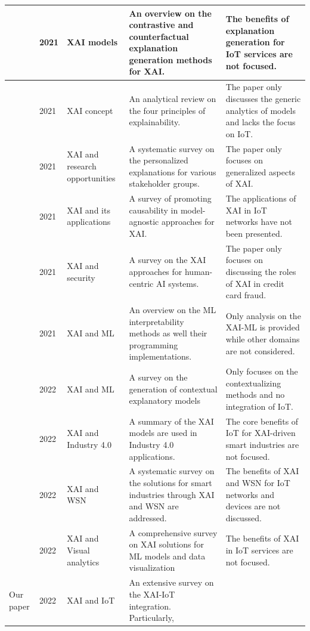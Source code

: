 \documentclass[journal]{IEEEtran}
\begin{document}
\begin{table}[!ht]
\begin{tabular}{|p{0.45cm}|p{0.5cm}|p{2.0cm}|p{7.45cm}|p{5.5cm}|}
\cite{stepin2021survey}  & 2021 & XAI models & An overview on the contrastive and counterfactual
explanation generation methods for XAI. & The benefits of explanation generation for IoT services are not focused.  \\ \hline
\cite{angelov2021explainable}  & 2021 & XAI concept & An analytical review on the four principles of explainability. & The paper only discusses the generic analytics of models and lacks the focus on IoT.  \\ \hline
\cite{meske2021explainable}  & 2021 & XAI and research opportunities & A systematic survey on the personalized explanations for various stakeholder groups. & The paper only focuses on generalized aspects of XAI.  \\ \hline
\cite{chou2021counterfactuals}  & 2021 & XAI and its applications & A survey of promoting causability in model-agnostic approaches for XAI. & The applications of XAI in IoT networks have not been presented.   \\ \hline
\cite{islam2021explainable}  & 2021 & XAI and security & A survey on the XAI approaches for human-centric AI systems. & The paper only focuses on discussing the roles of XAI in credit card fraud. \\ \hline
\cite{linardatos2021explainable}  & 2021 & XAI and ML & An overview on the ML interpretability methods as well their programming implementations. & Only analysis on the XAI-ML is provided while other domains are not considered.  \\ \hline
\cite{islam2022past}  & 2022 &  XAI and ML  &  A survey on the generation of contextual explanatory models & Only focuses on the contextualizing methods and no integration of IoT.  \\ \hline
\cite{ahmed2022artificial}  & 2022 &  XAI and Industry 4.0  &  A summary of the XAI models are used in Industry 4.0 applications. &  The core benefits of IoT for XAI-driven smart industries are not focused. \\ \hline
\cite{majid2022applications}  & 2022 & XAI and WSN &  A systematic survey on the solutions for smart industries through XAI and WSN are addressed. &  The benefits of XAI and WSN for IoT networks and devices are not discussed. \\ \hline
\cite{alicioglu2022survey}  & 2022 & XAI and Visual analytics &  A comprehensive survey on XAI solutions for ML models and data visualization & The benefits of XAI in IoT services are not focused.  \\ \hline
Our \newline paper & 2022 & XAI and IoT & An extensive survey on the XAI-IoT integration. Particularly, 

\end{tabular}
\end{table}
\end{document}
